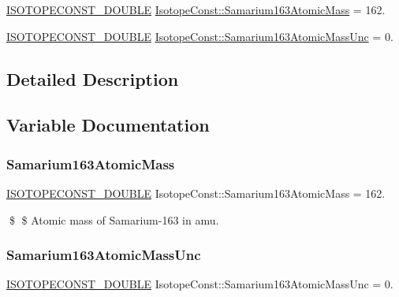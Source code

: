 \begin{DoxyCompactItemize}
\item 
\mbox{\hyperlink{group___isotope_const-_macros_ga8f45a7272ce02c0b4c65c44636ed719a}{I\+S\+O\+T\+O\+P\+E\+C\+O\+N\+S\+T\+\_\+\+D\+O\+U\+B\+LE}} \mbox{\hyperlink{group___isotope_const-_samarium-_sm163_ga5501280f13baa76c462ca950a40e5edd}{Isotope\+Const\+::\+Samarium163\+Atomic\+Mass}} = 162.
\item 
\mbox{\hyperlink{group___isotope_const-_macros_ga8f45a7272ce02c0b4c65c44636ed719a}{I\+S\+O\+T\+O\+P\+E\+C\+O\+N\+S\+T\+\_\+\+D\+O\+U\+B\+LE}} \mbox{\hyperlink{group___isotope_const-_samarium-_sm163_gaa53500485ef591f53cd9bc1442c6dd01}{Isotope\+Const\+::\+Samarium163\+Atomic\+Mass\+Unc}} = 0.
\end{DoxyCompactItemize}


\subsection{Detailed Description}


\subsection{Variable Documentation}
\mbox{\label{group___isotope_const-_samarium-_sm163_ga5501280f13baa76c462ca950a40e5edd}} 
\subsubsection{\texorpdfstring{Samarium163\+Atomic\+Mass}{Samarium163AtomicMass}}
{\footnotesize\ttfamily \mbox{\hyperlink{group___isotope_const-_macros_ga8f45a7272ce02c0b4c65c44636ed719a}{I\+S\+O\+T\+O\+P\+E\+C\+O\+N\+S\+T\+\_\+\+D\+O\+U\+B\+LE}} Isotope\+Const\+::\+Samarium163\+Atomic\+Mass = 162.}

\$ \$ Atomic mass of Samarium-\/163 in amu. \mbox{\label{group___isotope_const-_samarium-_sm163_gaa53500485ef591f53cd9bc1442c6dd01}} 
\subsubsection{\texorpdfstring{Samarium163\+Atomic\+Mass\+Unc}{Samarium163AtomicMassUnc}}
{\footnotesize\ttfamily \mbox{\hyperlink{group___isotope_const-_macros_ga8f45a7272ce02c0b4c65c44636ed719a}{I\+S\+O\+T\+O\+P\+E\+C\+O\+N\+S\+T\+\_\+\+D\+O\+U\+B\+LE}} Isotope\+Const\+::\+Samarium163\+Atomic\+Mass\+Unc = 0.}

